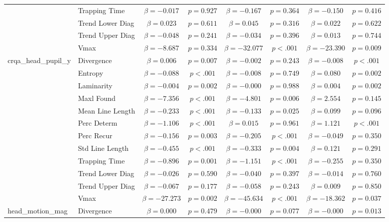 \begin{tabular}{llcc|cc|cc}
 & Trapping Time & $\beta = -0.017$ & $p = 0.927$ & $\beta = -0.167$ & $p = 0.364$ & $\beta = -0.150$ & $p = 0.416$ \\
 & Trend Lower Diag & $\beta = 0.023$ & $p = 0.611$ & $\beta = 0.045$ & $p = 0.316$ & $\beta = 0.022$ & $p = 0.622$ \\
 & Trend Upper Diag & $\beta = -0.048$ & $p = 0.241$ & $\beta = -0.034$ & $p = 0.396$ & $\beta = 0.013$ & $p = 0.744$ \\
 & Vmax & $\beta = -8.687$ & $p = 0.334$ & $\beta = -32.077$ & $p < .001$ & $\beta = -23.390$ & $p = 0.009$ \\
\midrule
\multirow{12}{*}{crqa_head_pupil_y} & Divergence & $\beta = 0.006$ & $p = 0.007$ & $\beta = -0.002$ & $p = 0.243$ & $\beta = -0.008$ & $p < .001$ \\
 & Entropy & $\beta = -0.088$ & $p < .001$ & $\beta = -0.008$ & $p = 0.749$ & $\beta = 0.080$ & $p = 0.002$ \\
 & Laminarity & $\beta = -0.004$ & $p = 0.002$ & $\beta = -0.000$ & $p = 0.988$ & $\beta = 0.004$ & $p = 0.002$ \\
 & Maxl Found & $\beta = -7.356$ & $p < .001$ & $\beta = -4.801$ & $p = 0.006$ & $\beta = 2.554$ & $p = 0.145$ \\
 & Mean Line Length & $\beta = -0.233$ & $p < .001$ & $\beta = -0.133$ & $p = 0.025$ & $\beta = 0.099$ & $p = 0.096$ \\
 & Perc Determ & $\beta = -1.106$ & $p < .001$ & $\beta = 0.015$ & $p = 0.961$ & $\beta = 1.121$ & $p < .001$ \\
 & Perc Recur & $\beta = -0.156$ & $p = 0.003$ & $\beta = -0.205$ & $p < .001$ & $\beta = -0.049$ & $p = 0.350$ \\
 & Std Line Length & $\beta = -0.455$ & $p < .001$ & $\beta = -0.333$ & $p = 0.004$ & $\beta = 0.121$ & $p = 0.291$ \\
 & Trapping Time & $\beta = -0.896$ & $p = 0.001$ & $\beta = -1.151$ & $p < .001$ & $\beta = -0.255$ & $p = 0.350$ \\
 & Trend Lower Diag & $\beta = -0.026$ & $p = 0.590$ & $\beta = -0.040$ & $p = 0.397$ & $\beta = -0.014$ & $p = 0.760$ \\
 & Trend Upper Diag & $\beta = -0.067$ & $p = 0.177$ & $\beta = -0.058$ & $p = 0.243$ & $\beta = 0.009$ & $p = 0.850$ \\
 & Vmax & $\beta = -27.273$ & $p = 0.002$ & $\beta = -45.634$ & $p < .001$ & $\beta = -18.362$ & $p = 0.037$ \\
\midrule
\multirow{12}{*}{head_motion_mag} & Divergence & $\beta = 0.000$ & $p = 0.479$ & $\beta = -0.000$ & $p = 0.077$ & $\beta = -0.000$ & $p = 0.013$ \\

\end{tabular}
